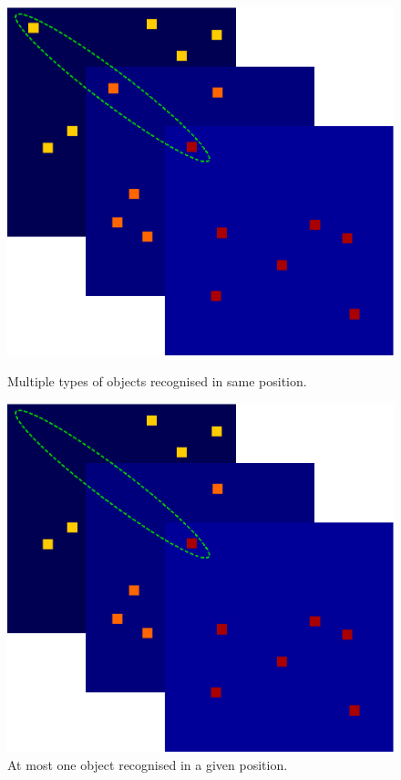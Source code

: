 \begin{figure}[h!]
\centering
\captionsetup{justification=centering}
\begin{multicols}{2}
    \includegraphics[scale=0.4]{figures/methods/winner_takes_all_object_on_every_filter.eps}
    \caption{Multiple types of objects recognised in same position.}
    \includegraphics[scale=0.4]{figures/methods/winner_takes_all_object_on_one_filter.eps}
    \caption{At most one object recognised in a given position.}
\end{multicols}
\label{fig:winner_takes_all_activations_on_layers}
\end{figure}


